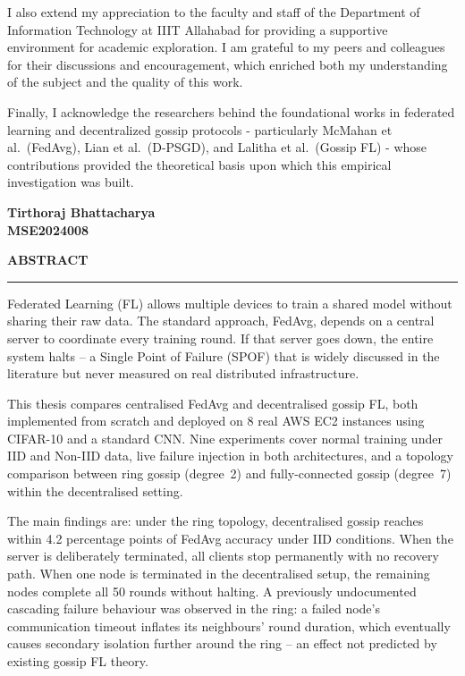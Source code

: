 \documentclass[12pt]{report}
\begin{document}
I also extend my appreciation to the faculty and staff of the Department of
Information Technology at IIIT Allahabad for providing a supportive environment
for academic exploration. I am grateful to my peers and colleagues for their
discussions and encouragement, which enriched both my understanding of the subject
and the quality of this work.

Finally, I acknowledge the researchers behind the foundational works in federated
learning and decentralized gossip protocols - particularly McMahan et al.\
(FedAvg), Lian et al.\ (D-PSGD), and Lalitha et al.\ (Gossip FL) - whose
contributions provided the theoretical basis upon which this empirical
investigation was built.

\vspace{1cm}
\begin{flushright}
\textbf{Tirthoraj Bhattacharya} \\
\textbf{MSE2024008}
\end{flushright}

\newpage
\thispagestyle{empty}
\begin{center}
\textbf{\LARGE ABSTRACT}
\end{center}

\vspace{0.3cm}
\noindent\rule{\textwidth}{0.4pt}
\vspace{0.4cm}
\onehalfspacing

Federated Learning (FL) allows multiple devices to train a shared model without
sharing their raw data. The standard approach, FedAvg, depends on a central
server to coordinate every training round. If that server goes down, the entire
system halts -- a Single Point of Failure (SPOF) that is widely discussed in
the literature but never measured on real distributed infrastructure.

This thesis compares centralised FedAvg and decentralised gossip FL, both
implemented from scratch and deployed on 8 real AWS EC2 instances using
CIFAR-10 and a standard CNN. Nine experiments cover normal training under IID
and Non-IID data, live failure injection in both architectures, and a topology
comparison between ring gossip (degree~2) and fully-connected gossip (degree~7)
within the decentralised setting.

The main findings are: under the ring topology, decentralised gossip reaches
within 4.2 percentage points of FedAvg accuracy under IID conditions. When the
server is deliberately terminated, all clients stop permanently with no recovery
path. When one node is terminated in the decentralised setup, the remaining
nodes complete all 50 rounds without halting. A previously undocumented cascading
failure behaviour was observed in the ring: a failed node's communication timeout
inflates its neighbours' round duration, which eventually causes secondary
isolation further around the ring -- an effect not predicted by existing gossip
FL theory.
\end{document}

